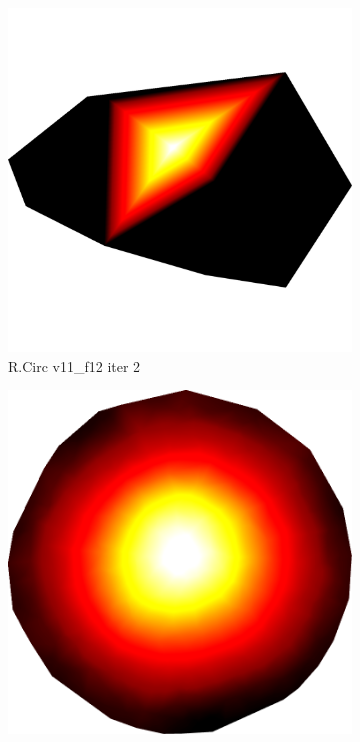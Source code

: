 \begin{figure}[ht]
{	\bigskip
	\begin{subfigure}[b]{0.48\linewidth}
		\includegraphics[width=1.0\linewidth,height=0.3\textheight,keepaspectratio]{data/synthetic_meshes/random_circle_tessellation_Dirac_delta_1_v11_f12_funcvals_0iter.png}
		\caption{R.Circ v11\_f12 iter 2}\label{fig:rcirc.e}
	\end{subfigure}
	\begin{subfigure}[b]{0.48\linewidth}
		\includegraphics[width=1.0\linewidth,height=0.3\textheight,keepaspectratio]{data/synthetic_meshes/random_circle_tessellation_Dirac_delta_10_v641_f1252_funcvals_10000iter.png}

\end{subfigure}}
\end{figure}
